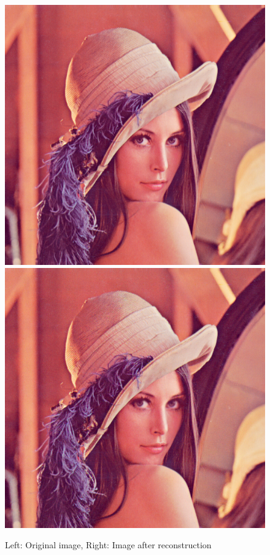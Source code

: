 \documentclass[12pt]{article}
\begin{document}
\begin{figure}[h]
\centerline{%
\includegraphics[scale=0.45]{"lena"}%
\hspace{0.1cm}
\includegraphics[scale=0.45]{"Lena Embed once 0.7 threshold/finalImageAfterRestoration"}%
}%
\caption{Left: Original image, Right: Image after reconstruction}
\label{fig:lenaEmbedOnceRestoredOriginal}
\end{figure}
\end{document}
